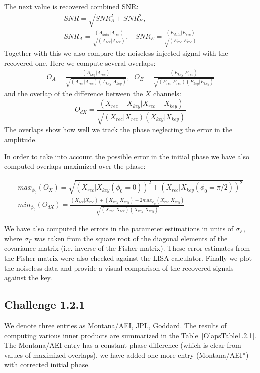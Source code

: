 \documentclass[11pt]{article}
\def\be{\begin{equation}}
\def\bea{\begin{eqnarray}}
\def\en{\end{equation}}
\def\ena{\end{eqnarray}}
\begin{document}
The next value is recovered combined SNR:
\bea
SNR  = \sqrt{SNR_A^2 + SNR_E^2},\\
SNR_A = \frac{(A_{data}|A_{rec})}{\sqrt{(A_{rec}|A_{rec})}},\;\;\;
SNR_E= \frac{(E_{data}|E_{rec})}{\sqrt{(E_{rec}|E_{rec})}}
\ena
Together with this we also compare the noiseless injected signal with 
the recovered one. Here we compute several overlaps:
\bea
O_A = \frac{(A_{key}|A_{rec})}{\sqrt{(A_{rec}|A_{rec})(A_{key}|A_{key})}}, \;\; 
O_E = \frac{(E_{key}|E_{rec})}{\sqrt{(E_{rec}|E_{rec})(E_{key}|E_{key})}}
\ena
and the overlap of the difference between the $X$ channels:
\be
O_{dX} = \frac{(X_{rec}-X_{key}|X_{rec}-X_{key})}
{\sqrt{(X_{rec}|X_{rec})(X_{key}|X_{key})}}
\en
The overlaps show how well we track the phase neglecting the error in 
the amplitude.

In order to take into account the possible error in the initial 
phase we have also computed overlaps maximized over the phase:

\bea
max_{\phi_0}(O_X) = \sqrt{(X_{rec}|X_{key}(\phi_0 = 0))^2 +
(X_{rec}|X_{key}(\phi_0 = \pi/2))^2}\\
min_{\phi_0}(O_{dX}) = \frac{ (X_{rec}|X_{rec}) + (X_{key}|X_{key}) -
2 max_{\phi_0}(X_{rec}|X_{key})}{\sqrt{(X_{rec}|X_{rec})(X_{key}|X_{key})}}
\ena

We have also computed the errors in the parameter estimations in units 
of $\sigma_{F}$, where $\sigma_{F}$ was taken from the square root of the diagonal elements of the covariance matrix (i.e. inverse of the Fisher matrix). These error estimates from the Fisher matrix were also checked against the LISA calculator.  Finally we plot the noiseless data and provide a visual comparison of the recovered signals against the key.

\subsection{Challenge 1.2.1}

We denote three entries as Montana/AEI, JPL, Goddard.
The results of computing various inner products are summarized in the 
Table~\ref{OlapsTable1.2.1}. The Montana/AEI entry has a constant phase difference (which is clear from values of
maximized overlaps), we have added one more entry (Montana/AEI*) with corrected initial phase.
\end{document}
